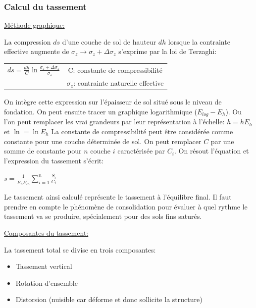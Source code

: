             \subsubsection{Calcul du tassement}
            
            \underline{Méthode graphique:} 
            
            La compression $ds$ d'une couche de sol de hauteur $dh$ lorsque la contrainte effective augmente de $\sigma_z \to \sigma_z + \Delta \sigma_z$ s'exprime par la loi de Terzaghi:
            
            \begin{center}
            \begin{tabular}{c|c}
                $ds = \frac{dh}{C} \ln \frac{\sigma_z + \Delta \sigma_z}{\sigma_z}$ 
                    &  C: constante de compressibilité  \\
                    &  $\sigma_z$: contrainte naturelle effective  
            \end{tabular}
            \end{center}
            
            On intègre cette expression sur l'épaisseur de sol situé sous le niveau de fondation. On peut ensuite tracer un graphique logarithmique ($E_{log} - E_h$). Ou l'on peut remplacer les vrai grandeurs par leur représentation à l'échelle: $h=h E_h$ et $\ln = \ln E_h$
            La constante de compressibilité peut être considérée comme constante pour une couche déterminée de sol. On peut remplacer $C$ par une somme de constante pour $n$ couche $i$ caractérisée par $C_i$. On résout l'équation et l'expression du tassement s'écrit:
            
            \begin{center}
                $s = \frac{1}{\bar{E_h}\bar{E_{ln}}} \sum_{i=1}^{n}\frac{\bar{S_i}}{C_i}$
            \end{center}
            
            Le tassement ainsi calculé représente le tassement à l'équilibre final. Il faut prendre en compte le phénomène de consolidation pour évaluer à quel rythme le tassement va se produire, spécialement pour des sols fins saturés.
            
            \underline{Composantes du tassement:} 
            
            La tassement total se divise en trois composantes:
            \begin{itemize}
                \item Tassement vertical
                \item Rotation d'ensemble
                \item Distorsion (nuisible car déforme et donc sollicite la structure)
            \end{itemize} 
            
